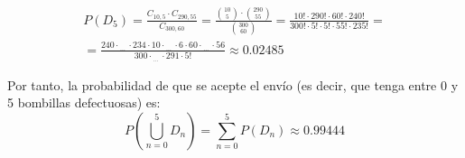 \begin{ejercicio}
\begin{multline*}
    \end{multline*}
    \begin{multline*}
        P(D_5) = \frac{C_{10,5}\cdot C_{290,55}}{C_{300,60}} = \frac{\binom{10}{5}\cdot \binom{290}{55}}{\binom{300}{60}} = \frac{10!\cdot 290! \cdot 60! \cdot 240!}{300!\cdot 5!\cdot 5! \cdot 55! \cdot 235!} =\\= \frac{240\cdot_{\; \dots} \cdot 234\cdot 10\cdot_{\; \dots} \cdot 6 \cdot 60\cdot_{\; \dots} \cdot 56}{300\cdot_{\; \dots} \cdot 291\cdot 5!} \approx 0.02485
    \end{multline*}


    Por tanto, la probabilidad de que se acepte el envío (es decir, que tenga entre 0 y 5 bombillas defectuosas) es:
    \begin{equation*}
        P\left(\bigcup_{n=0}^5 D_n\right) = \sum_{n=0}^5 P(D_n) \approx 0.99444
    \end{equation*}
    
\end{ejercicio}

